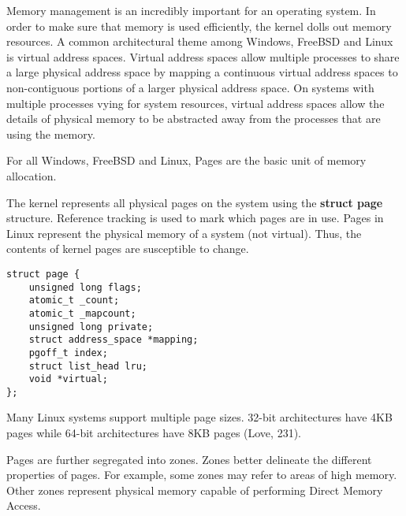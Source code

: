 Memory management is an incredibly important for an operating system.  In order to make sure that memory is used efficiently, the kernel dolls out memory resources.  A common architectural theme among Windows, FreeBSD and Linux is virtual address spaces.  Virtual address spaces allow multiple processes to share a large physical address space by mapping a continuous virtual address spaces to non-contiguous portions of a larger physical address space.  On systems with multiple processes vying for system resources, virtual address spaces allow the details of physical memory to be abstracted away from the processes that are using the memory.

For all Windows, FreeBSD and Linux, Pages are the basic unit of memory allocation.

The kernel represents all physical pages on the system using the \textbf{struct page} structure.
Reference tracking is used to mark which pages are in use.  Pages in Linux represent the physical memory of a system (not virtual).  Thus, the contents of kernel pages are susceptible to change.

\begin{lstlisting}
struct page {
	unsigned long flags;
	atomic_t _count;
	atomic_t _mapcount;
	unsigned long private;
	struct address_space *mapping;
	pgoff_t index;
	struct list_head lru;
	void *virtual;
};
\end{lstlisting}

Many Linux systems support multiple page sizes.  32-bit architectures have 4KB pages while 64-bit architectures have 8KB pages (Love, 231).

Pages are further segregated into zones.  Zones better delineate the different properties of pages.  For example, some zones may refer to areas of high memory.  Other zones represent physical memory capable of performing Direct Memory Access.

